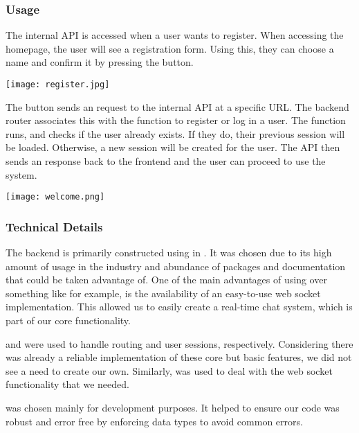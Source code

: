 \subsubsection{Usage}
The internal API is accessed when a user wants to register. When accessing the homepage, the user will see a registration form. Using this, they can choose a name and confirm it by pressing the button.

\begin{center}
    \texttt{[image: register.jpg]}
\end{center}

The  button sends an  request to the internal API at a specific URL. The backend router associates this with the function to register or log in a user. The function runs, and checks if the user already exists. If they do, their previous session will be loaded. Otherwise, a new session will be created for the user. The API then sends an  response back to the frontend and the user can proceed to use the system.

\begin{center}
    \texttt{[image: welcome.png]}
\end{center}

\subsubsection{Technical Details}
The backend is primarily constructed using  in . It was chosen due to its high amount of usage in the industry and abundance of packages and documentation that could be taken advantage of. One of the main advantages of using  over something like  for example, is the availability of an easy-to-use web socket implementation. This allowed us to easily create a real-time chat system, which is part of our core functionality.

 and  were used to handle routing and user sessions, respectively. Considering there was already a reliable implementation of these core but basic features, we did not see a need to create our own. Similarly,  was used to deal with the web socket functionality that we needed.

 was chosen mainly for development purposes. It helped to ensure our code was robust and error free by enforcing data types to avoid common  errors.

\newpage
